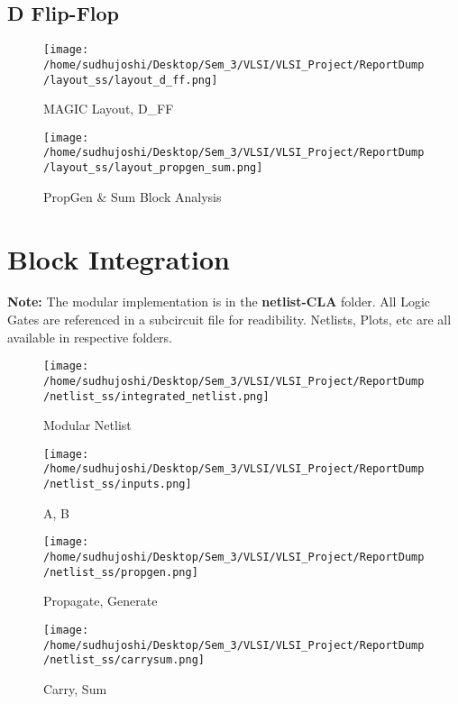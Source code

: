\documentclass[conference]{IEEEtran}
\begin{document}
\subsection{D Flip-Flop}
\begin{figure}[H] 
    \centering
    \texttt{[image: /home/sudhujoshi/Desktop/Sem\_3/VLSI/VLSI\_Project/ReportDump/layout\_ss/layout\_d\_ff.png]}
    \caption{MAGIC Layout, D\_FF} 
\end{figure}

\begin{figure}[H] 
    \centering
    \texttt{[image: /home/sudhujoshi/Desktop/Sem\_3/VLSI/VLSI\_Project/ReportDump/layout\_ss/layout\_propgen\_sum.png]}
    \caption{PropGen \& Sum Block Analysis} 
\end{figure}




\section{Block Integration}
\textbf{Note:} The modular implementation is in the \textbf{netlist-CLA} folder. 
All Logic Gates are referenced in a subcircuit file for readibility.
Netlists, Plots, etc are all available in respective folders.
\begin{figure}[H] 
    \centering
    \texttt{[image: /home/sudhujoshi/Desktop/Sem\_3/VLSI/VLSI\_Project/ReportDump/netlist\_ss/integrated\_netlist.png]}
    \caption{Modular Netlist} 
\end{figure}
\begin{figure}[H] 
    \centering
    \texttt{[image: /home/sudhujoshi/Desktop/Sem\_3/VLSI/VLSI\_Project/ReportDump/netlist\_ss/inputs.png]}
    \caption{A, B} 
\end{figure}
\begin{figure}[H] 
    \centering
    \texttt{[image: /home/sudhujoshi/Desktop/Sem\_3/VLSI/VLSI\_Project/ReportDump/netlist\_ss/propgen.png]}
    \caption{Propagate, Generate} 
\end{figure}
\begin{figure}[H] 
    \centering
    \texttt{[image: /home/sudhujoshi/Desktop/Sem\_3/VLSI/VLSI\_Project/ReportDump/netlist\_ss/carrysum.png]}
    \caption{Carry, Sum} 
\end{figure}
\end{document}
